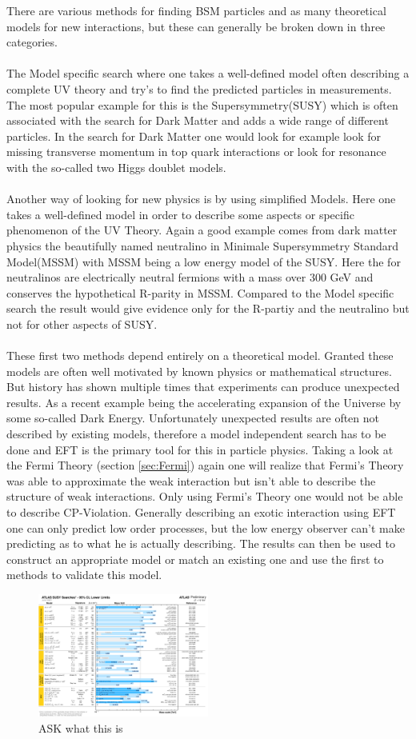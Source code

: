 \documentclass[../Bachelorarbeit.tex]{subfiles}
\begin{document}
There are various methods for finding BSM particles and as many theoretical models for new interactions, but these can generally be broken down in three categories.
\\\\
The Model specific search where one takes a well-defined model often describing a complete UV theory and try's to find the predicted particles in measurements.
The most popular example for this is the Supersymmetry(SUSY) which is often associated with the search for Dark Matter and adds a wide range of different particles.
In the search for Dark Matter one would look for example look for missing transverse momentum in top quark interactions or look for resonance with the so-called
two Higgs doublet models.
\\\\
Another way of looking for new physics is by using simplified Models. Here one takes a well-defined model in order to describe some aspects or specific phenomenon of the UV Theory.
Again a good example comes from dark matter physics the beautifully named neutralino in Minimale Supersymmetry Standard Model(MSSM) with MSSM being a low energy model of the SUSY.
Here the for neutralinos are electrically neutral fermions with a mass over 300 GeV and conserves the hypothetical R-parity in MSSM. Compared to the Model specific search the result
would give evidence only for the R-partiy and the neutralino but not for other aspects of SUSY.
\\\\
These first two methods depend entirely on a theoretical model. Granted these models are often well motivated by known physics or mathematical structures.
But history has shown multiple times that experiments can produce unexpected results. As a recent example being the accelerating expansion of the Universe by some so-called Dark Energy.
Unfortunately unexpected results are often not described by existing models, therefore a model independent search has to be done and EFT is the primary tool for this in particle physics.
Taking a look at the Fermi Theory (section \ref{sec:Fermi}) again one will realize that Fermi's Theory was able to approximate the weak interaction but isn't able to describe the
structure of weak interactions. Only using Fermi's Theory one would not be able to describe CP-Violation. Generally describing an exotic interaction using EFT one can only predict low order
processes, but the low energy observer can't make predicting as to what he is actually describing. The results can then be used to construct an appropriate model or match an existing one and
use the first to methods to validate this model.

\begin{figure}
    \centering
    \includegraphics[width=0.5\textwidth]{images/fig_23_ATLAS_SUSY.png}
    \caption{ASK what this is \cite{.07.06.2021}}
    \label{fig:ATLAS_SUSY}
\end{figure}
\end{document}

